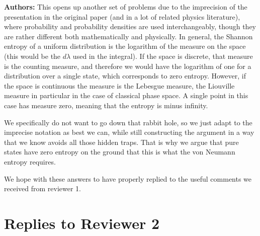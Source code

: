 \documentclass[11pt, executivepaper]{article}
\begin{document}
\begin{enumerate}
\textbf{Authors:} This opens up another set of problems due to the imprecision of the presentation in the original paper (and in a lot of related physics literature), where probability and probability densities are used interchangeably, though they are rather different both mathematically and physically. In general, the Shannon entropy of a uniform distribution is the logarithm of the measure on the space (this would be the $d\lambda$ used in the integral). If the space is discrete, that measure is the counting measure, and therefore we would have the logarithm of one for a distribution over a single state, which corresponds to zero entropy. However, if the space is continuous the measure is the Lebesgue measure, the Liouville measure in particular in the case of classical phase space. A single point in this case has measure zero, meaning that the entropy is minus infinity.

We specifically do not want to go down that rabbit hole, so we just adapt to the imprecise notation as best we can, while still constructing the argument in a way that we know avoids all those hidden traps. That is why we argue that pure states have zero entropy on the ground that this is what the von Neumann entropy requires.


\end{enumerate}
 

We hope with these answers to have properly replied to the useful comments we received from reviewer 1. 

\section{Replies to Reviewer 2}
\end{document}
